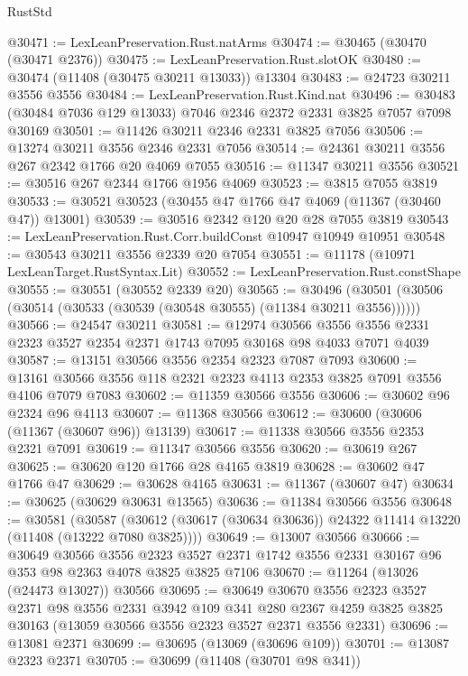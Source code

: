 \begin{lexlean}{RustStd}
\begin{coremodule}
@30471 := LexLeanPreservation.Rust.natArms
@30474 := @30465 (@30470 (@30471 @2376))
@30475 := LexLeanPreservation.Rust.slotOK
@30480 := @30474 (@11408 (@30475 @30211 @13033)) @13304
@30483 := @24723 @30211 @3556 @3556
@30484 := LexLeanPreservation.Rust.Kind.nat
@30496 := @30483 (@30484 @7036 @129 @13033) @7046 @2346 @2372 @2331 @3825 @7057 @7098 @30169
@30501 := @11426 @30211 @2346 @2331 @3825 @7056
@30506 := @13274 @30211 @3556 @2346 @2331 @7056
@30514 := @24361 @30211 @3556 @267 @2342 @1766 @20 @4069 @7055
@30516 := @11347 @30211 @3556
@30521 := @30516 @267 @2344 @1766 @1956 @4069
@30523 := @3815 @7055 @3819
@30533 := @30521 @30523 (@30455 @47 @1766 @47 @4069 (@11367 (@30460 @47)) @13001)
@30539 := @30516 @2342 @120 @20 @28 @7055 @3819
@30543 := LexLeanPreservation.Rust.Corr.buildConst @10947 @10949 @10951
@30548 := @30543 @30211 @3556 @2339 @20 @7054
@30551 := @11178 (@10971 LexLeanTarget.RustSyntax.Lit)
@30552 := LexLeanPreservation.Rust.constShape
@30555 := @30551 (@30552 @2339 @20)
@30565 := @30496 (@30501 (@30506 (@30514 (@30533 (@30539 (@30548 @30555) (@11384 @30211 @3556))))))
@30566 := @24547 @30211
@30581 := @12974
    @30566
    @3556
    @3556
    @2331
    @2323
    @3527
    @2354
    @2371
    @1743
    @7095
    @30168
    @98
    @4033
    @7071
    @4039
@30587 := @13151 @30566 @3556 @2354 @2323 @7087 @7093
@30600 := @13161 @30566 @3556 @118 @2321 @2323 @4113 @2353 @3825 @7091 @3556 @4106 @7079 @7083
@30602 := @11359 @30566 @3556
@30606 := @30602 @96 @2324 @96 @4113
@30607 := @11368 @30566
@30612 := @30600 (@30606 (@11367 (@30607 @96)) @13139)
@30617 := @11338 @30566 @3556 @2353 @2321 @7091
@30619 := @11347 @30566 @3556
@30620 := @30619 @267
@30625 := @30620 @120 @1766 @28 @4165 @3819
@30628 := @30602 @47 @1766 @47
@30629 := @30628 @4165
@30631 := @11367 (@30607 @47)
@30634 := @30625 (@30629 @30631 @13565)
@30636 := @11384 @30566 @3556
@30648 := @30581
    (@30587 (@30612 (@30617 (@30634 @30636)) @24322 @11414 @13220 (@11408 (@13222 @7080 @3825))))
@30649 := @13007 @30566
@30666 := @30649
    @30566
    @3556
    @2323
    @3527
    @2371
    @1742
    @3556
    @2331
    @30167
    @96
    @353
    @98
    @2363
    @4078
    @3825
    @3825
    @7106
@30670 := @11264 (@13026 (@24473 @13027)) @30566
@30695 := @30649
    @30670
    @3556
    @2323
    @3527
    @2371
    @98
    @3556
    @2331
    @3942
    @109
    @341
    @280
    @2367
    @4259
    @3825
    @3825
    @30163
    (@13059 @30566 @3556 @2323 @3527 @2371 @3556 @2331)
@30696 := @13081 @2371
@30699 := @30695 (@13069 (@30696 @109))
@30701 := @13087 @2323 @2371
@30705 := @30699 (@11408 (@30701 @98 @341))

\end{coremodule}
\end{lexlean}
